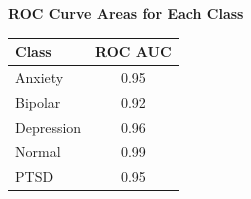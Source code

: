 \begin{center}
    \textbf{ROC Curve Areas for Each Class} \\[0.5em]
    \begin{tabular}{|l|c|}
        \hline
        \textbf{Class}  & \textbf{ROC AUC} \\ \hline
        Anxiety         & 0.95            \\ \hline
        Bipolar         & 0.92            \\ \hline
        Depression      & 0.96            \\ \hline
        Normal          & 0.99            \\ \hline
        PTSD            & 0.95            \\ \hline
    \end{tabular}
\end{center}

